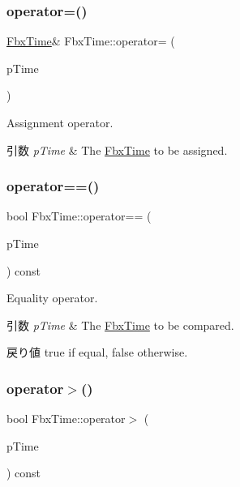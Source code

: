 \subsubsection{\texorpdfstring{operator=()}{operator=()}}
{\footnotesize\ttfamily \hyperlink{class_fbx_time}{Fbx\+Time}\& Fbx\+Time\+::operator= (\begin{DoxyParamCaption}\item[{const \hyperlink{class_fbx_time}{Fbx\+Time} \&}]{p\+Time }\end{DoxyParamCaption})}

Assignment operator. 
\begin{DoxyParams}{引数}
{\em p\+Time} & The \hyperlink{class_fbx_time}{Fbx\+Time} to be assigned. \\
\hline
\end{DoxyParams}
\mbox{\label{class_fbx_time_a9dae81e92ed8d293c22d0d09cc0d3ecc}} 
\subsubsection{\texorpdfstring{operator==()}{operator==()}}
{\footnotesize\ttfamily bool Fbx\+Time\+::operator== (\begin{DoxyParamCaption}\item[{const \hyperlink{class_fbx_time}{Fbx\+Time} \&}]{p\+Time }\end{DoxyParamCaption}) const}

Equality operator. 
\begin{DoxyParams}{引数}
{\em p\+Time} & The \hyperlink{class_fbx_time}{Fbx\+Time} to be compared. \\
\hline
\end{DoxyParams}
\begin{DoxyReturn}{戻り値}
{\ttfamily true} if equal, {\ttfamily false} otherwise. 
\end{DoxyReturn}
\mbox{\label{class_fbx_time_a0cce77e50858f177fa1c11556277010e}} 
\subsubsection{\texorpdfstring{operator$>$()}{operator>()}}
{\footnotesize\ttfamily bool Fbx\+Time\+::operator$>$ (\begin{DoxyParamCaption}\item[{const \hyperlink{class_fbx_time}{Fbx\+Time} \&}]{p\+Time }\end{DoxyParamCaption}) const}

